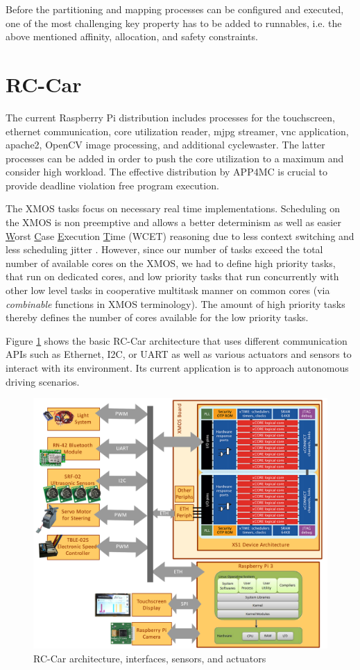 \documentclass [a4paper,final,conference,10pt]{IDAACS}
\begin{document}
Before the partitioning and mapping processes can be configured and executed, one of the most challenging key property has to be added to runnables, i.e. the above mentioned affinity, allocation, and safety constraints.
\section{RC-Car}
\label{sec:rccar}
The current Raspberry Pi distribution includes processes for the touchscreen, ethernet communication, core utilization reader, mjpg streamer, vnc application, apache2, OpenCV\cite{opencv} image processing, and additional cyclewaster. The latter processes can be added in order to push the core utilization to a maximum and consider high workload. The effective distribution by APP4MC is crucial to provide deadline violation free program execution. 

The XMOS tasks focus on necessary real time implementations. Scheduling on the XMOS is non preemptive and allows a better determinism as well as easier \underline{W}orst \underline{C}ase \underline{E}xecution \underline{T}ime (WCET) reasoning due to less context switching and less scheduling jitter \cite{xmos}. However, since our number of tasks exceed the total number of available cores on the XMOS, we had to define high priority tasks, that run on dedicated cores, and low priority tasks that run concurrently with other low level tasks in cooperative multitask manner on common cores (via \textit{combinable} functions in XMOS terminology). The amount of high priority tasks thereby defines the number of cores available for the low priority tasks. 

Figure \ref{fig:arch} shows the basic RC-Car architecture that uses different communication APIs such as Ethernet, I2C, or UART as well as various actuators and sensors to interact with its environment. Its current application is to approach autonomous driving scenarios.
\begin{figure}[bth]
	\centering
	\includegraphics[scale=0.118]{images/hwarch.png}
	\caption{\label{fig:arch}RC-Car architecture, interfaces, sensors, and actuators}
\end{figure}
\end{document}

